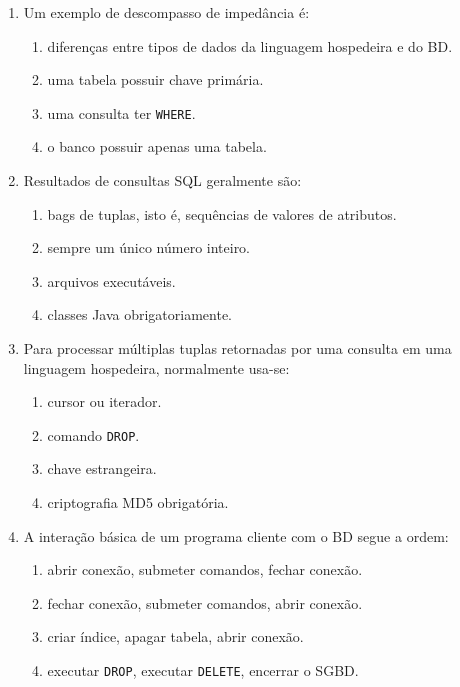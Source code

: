 \documentclass[12pt,a4paper]{article}
\begin{document}
\begin{enumerate}[label=\textbf{Q\arabic*.}]
\item Um exemplo de descompasso de impedância é:

\begin{enumerate}[label=\alph*)]
    \item diferenças entre tipos de dados da linguagem hospedeira e do BD.
    \item uma tabela possuir chave primária.
    \item uma consulta ter \texttt{WHERE}.
    \item o banco possuir apenas uma tabela.
\end{enumerate}

\item Resultados de consultas SQL geralmente são:

\begin{enumerate}[label=\alph*)]
    \item bags de tuplas, isto é, sequências de valores de atributos.
    \item sempre um único número inteiro.
    \item arquivos executáveis.
    \item classes Java obrigatoriamente.
\end{enumerate}

\item Para processar múltiplas tuplas retornadas por uma consulta em uma linguagem hospedeira, normalmente usa-se:

\begin{enumerate}[label=\alph*)]
    \item cursor ou iterador.
    \item comando \texttt{DROP}.
    \item chave estrangeira.
    \item criptografia MD5 obrigatória.
\end{enumerate}

\item A interação básica de um programa cliente com o BD segue a ordem:

\begin{enumerate}[label=\alph*)]
    \item abrir conexão, submeter comandos, fechar conexão.
    \item fechar conexão, submeter comandos, abrir conexão.
    \item criar índice, apagar tabela, abrir conexão.
    \item executar \texttt{DROP}, executar \texttt{DELETE}, encerrar o SGBD.
\end{enumerate}


\end{enumerate}
\end{document}
